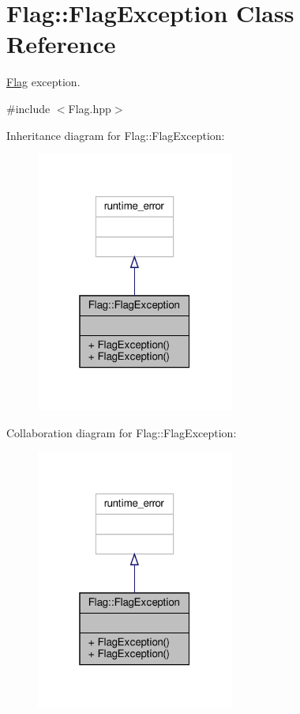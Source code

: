 \hypertarget{class_flag_1_1_flag_exception}{}\section{Flag\+:\+:Flag\+Exception Class Reference}
\label{class_flag_1_1_flag_exception}


\hyperlink{class_flag}{Flag} exception.  




{\ttfamily \#include $<$Flag.\+hpp$>$}



Inheritance diagram for Flag\+:\+:Flag\+Exception\+:
\nopagebreak
\begin{figure}[H]
\begin{center}
\leavevmode
\includegraphics[width=184pt]{class_flag_1_1_flag_exception__inherit__graph}
\end{center}
\end{figure}


Collaboration diagram for Flag\+:\+:Flag\+Exception\+:
\nopagebreak
\begin{figure}[H]
\begin{center}
\leavevmode
\includegraphics[width=184pt]{class_flag_1_1_flag_exception__coll__graph}
\end{center}
\end{figure}

